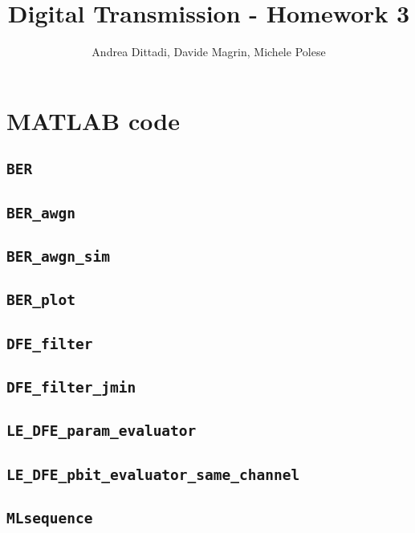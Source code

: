 \documentclass[10pt]{article}
\numberwithin{equation}{section}
\begin{document}
\title{Digital Transmission - Homework 3}
\author{Andrea Dittadi, Davide Magrin, Michele Polese}

\maketitle

\section*{MATLAB code}
\subsection*{\texttt{BER}}

\subsection*{\texttt{BER\_awgn}}

\subsection*{\texttt{BER\_awgn\_sim}}

\subsection*{\texttt{BER\_plot}}

\subsection*{\texttt{DFE\_filter}}

\subsection*{\texttt{DFE\_filter\_jmin}}

\subsection*{\texttt{LE\_DFE\_param\_evaluator}}

\subsection*{\texttt{LE\_DFE\_pbit\_evaluator\_same\_channel}}

\subsection*{\texttt{MLsequence}}

\end{document}
